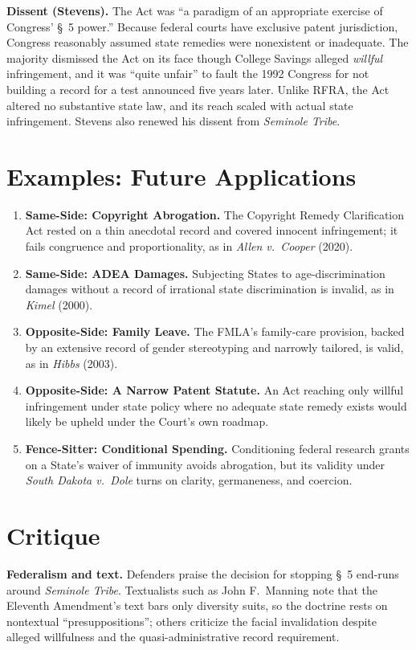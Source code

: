 \documentclass[12pt]{article}
\begin{document}
\textbf{Dissent (Stevens).} The Act was ``a paradigm of an appropriate exercise of Congress' \S~5 power.'' Because federal courts have exclusive patent jurisdiction, Congress reasonably assumed state remedies were nonexistent or inadequate. The majority dismissed the Act on its face though College Savings alleged \textit{willful} infringement, and it was ``quite unfair'' to fault the 1992 Congress for not building a record for a test announced five years later. Unlike RFRA, the Act altered no substantive state law, and its reach scaled with actual state infringement. Stevens also renewed his dissent from \textit{Seminole Tribe}.

\section{Examples: Future Applications}

\begin{enumerate}
\item \textbf{Same-Side: Copyright Abrogation.} The Copyright Remedy Clarification Act rested on a thin anecdotal record and covered innocent infringement; it fails congruence and proportionality, as in \textit{Allen v.\ Cooper} (2020).
\item \textbf{Same-Side: ADEA Damages.} Subjecting States to age-discrimination damages without a record of irrational state discrimination is invalid, as in \textit{Kimel} (2000).
\item \textbf{Opposite-Side: Family Leave.} The FMLA's family-care provision, backed by an extensive record of gender stereotyping and narrowly tailored, is valid, as in \textit{Hibbs} (2003).
\item \textbf{Opposite-Side: A Narrow Patent Statute.} An Act reaching only willful infringement under state policy where no adequate state remedy exists would likely be upheld under the Court's own roadmap.
\item \textbf{Fence-Sitter: Conditional Spending.} Conditioning federal research grants on a State's waiver of immunity avoids abrogation, but its validity under \textit{South Dakota v.\ Dole} turns on clarity, germaneness, and coercion.
\end{enumerate}

\section{Critique}

\textbf{Federalism and text.} Defenders praise the decision for stopping \S~5 end-runs around \textit{Seminole Tribe}. Textualists such as John F.\ Manning note that the Eleventh Amendment's text bars only diversity suits, so the doctrine rests on nontextual ``presuppositions''; others criticize the facial invalidation despite alleged willfulness and the quasi-administrative record requirement.
\end{document}
